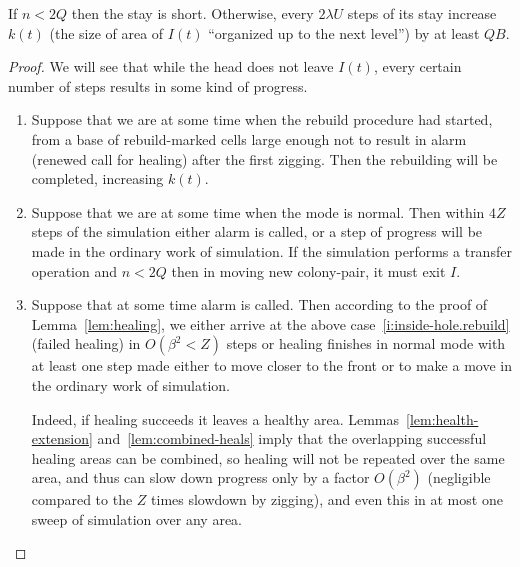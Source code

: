 \documentclass[11pt]{memoir}
\theoremstyle{definition} %
\def\B{B}
\def\U{U}
\newcommand{\Q}{Q} %
\newcommand{\Z}{Z} %
\begin{document}
\begin{lemma}\label{lem:inside-hole}
  If \( n< 2\Q \) then the stay is short.
  Otherwise, every \( 2\lambda\U \) steps of its stay increase
  \( k(t) \) (the size of area of \( I(t) \) ``organized up to the next level'') by at least \( \Q\B \).
\end{lemma}
\begin{proof}
  We will see that while the head does not leave \( I(t) \),
  every certain number of steps results in some kind of progress.
  \begin{enumerate}
  \item\label{i:inside-hole.rebuild}
Suppose that we are at some time when the rebuild procedure had started,
from a base of rebuild-marked cells large enough not to result in alarm (renewed call for healing)
after the first zigging.
Then the rebuilding will be completed, increasing \( k(t) \).

\item\label{i:inside-hole.normal}
  Suppose that we are at some time when the mode is normal.
  Then within \( 4\Z \) steps of the simulation
  either alarm is called, or a step of progress will be
  made in the ordinary work of simulation.
  If the simulation performs a transfer operation and \( n<2\Q \)
  then in moving new colony-pair, it must exit \( I \).
  
\item\label{i:inside-hole.alarm}
  Suppose that at some time alarm is called.
  Then according to the proof of Lemma~\ref{lem:healing},
  we either arrive at the above case~\ref{i:inside-hole.rebuild} (failed healing)
  in \( O(\beta^{2}<\Z) \) steps or healing finishes in
  normal mode with at least one step made either to move closer to the front or to make a move
  in the ordinary work of simulation.
  
  Indeed, if healing succeeds it leaves a healthy area.
  Lemmas~\ref{lem:health-extension} and~\ref{lem:combined-heals} imply that 
  the overlapping successful healing areas can be combined, so healing will not be repeated over the same
  area, and thus can slow down progress only by a 
  factor \( O(\beta^{2}) \) (negligible compared to the \( \Z \) times slowdown by zigging), and even this
  in at most one sweep of simulation over any area.


\end{enumerate}
\end{proof}
\end{document}
